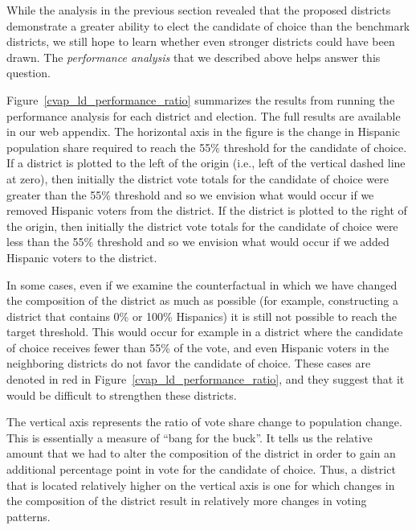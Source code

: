 \documentclass[12pt]{article}
\begin{document}
While the analysis in the previous section revealed that the proposed districts
demonstrate a greater ability to elect the candidate of choice than the benchmark districts, 
we still hope to learn whether even stronger districts could have been drawn.
The \emph{performance analysis} that we described above helps answer this question.

Figure~\ref{cvap_ld_performance_ratio} summarizes the results from
running the performance analysis for each district and election.
The full results are available in our web appendix. The horizontal
axis in the figure is the change in Hispanic population share required
to reach the 55\% threshold for the candidate of choice. If a district
is plotted to the left of the origin (i.e., left of the vertical
dashed line at zero), then initially the district vote totals for the
candidate of choice were greater than the 55\% threshold and so we
envision what would occur if we removed Hispanic voters from the
district. If the district is plotted to the right of the origin, then
initially the district vote totals for the candidate of choice were
less than the 55\% threshold and so we envision what would occur if we
added Hispanic voters to the district.

In some cases, even if we examine the counterfactual in which we have
changed the composition of the district as much as possible (for
example, constructing a district that contains 0\% or 100\% Hispanics)
it is still not possible to reach the target threshold. This would
occur for example in a district where the candidate of choice receives
fewer than 55\% of the vote, and even Hispanic voters in the
neighboring districts do not favor the candidate of choice. These cases 
are denoted in red in Figure~\ref{cvap_ld_performance_ratio}, and they suggest
that it would be difficult to strengthen these districts.

The vertical axis represents the ratio of vote share change to
population change. This is essentially a measure of ``bang for the
buck''. It tells us the relative amount that we had to alter the
composition of the district in order to gain an additional percentage
point in vote for the candidate of choice. Thus, a district that is
located relatively higher on the vertical axis is one for which
changes in the composition of the district result in relatively more
changes in voting patterns.
\end{document}
